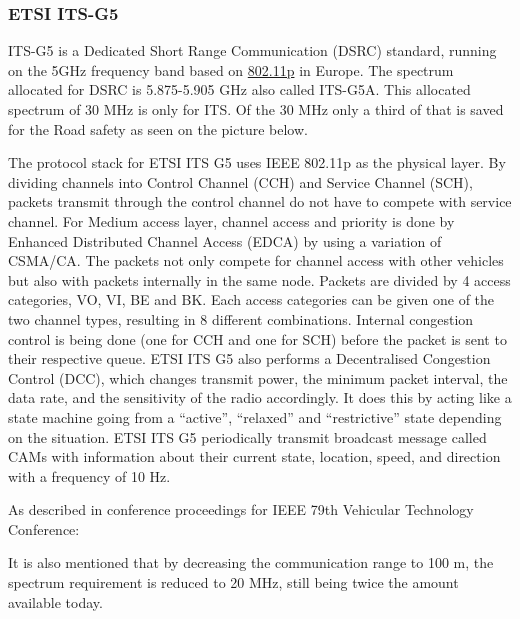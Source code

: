 \subsubsection{ETSI ITS-G5}\label{sec:ITS-G5}
ITS-G5 is a Dedicated Short Range Communication (DSRC) standard, running on the 5GHz frequency band based on \hyperref[sec:802.11p]{802.11p} in Europe.
The spectrum allocated for DSRC is 5.875-5.905 GHz also called ITS-G5A. This allocated spectrum of 30 MHz is only for ITS. Of the 30 MHz only a third of that is saved for the Road safety as seen on the picture below.\par
% 
The protocol stack for ETSI ITS G5 uses IEEE 802.11p as the physical layer. By dividing channels into Control Channel (CCH) and Service Channel (SCH), packets transmit through the control channel do not have to compete with service channel. For Medium access layer, channel access and priority is done by Enhanced Distributed Channel Access (EDCA) by using a variation of CSMA/CA. The packets not only compete for channel access with other vehicles but also with packets internally in the same node. Packets are divided by 4 access categories, VO, VI, BE and BK. Each access categories can be given one of the two channel types, resulting in 8 different combinations. Internal congestion control is being done (one for CCH and one for SCH) before the packet is sent to their respective queue. ETSI ITS G5 also performs a Decentralised Congestion Control (DCC), which changes transmit power, the minimum packet interval, the data rate, and the sensitivity of the radio accordingly. It does this by acting like a state machine going from a “active”, “relaxed” and “restrictive” state depending on the situation.
ETSI ITS G5 periodically transmit broadcast message called CAMs with information about their current state, location, speed, and direction with a frequency of 10 Hz.\par
% 
As described in conference proceedings for IEEE 79th Vehicular Technology Conference: \par 
% 
It is also mentioned that by decreasing the communication range to 100 m, the spectrum requirement is reduced to 20 MHz, still being twice the amount available today. 